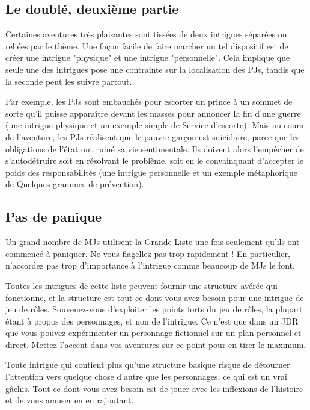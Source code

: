 \begin{multicols}{2}
\subsection*{Le doublé, deuxième partie}
\hypertarget{double2}{}

Certaines aventures très plaisantes sont tissées de deux intrigues séparées ou reliées par le thème. Une façon facile de faire marcher un tel dispositif est de créer une intrigue "physique" et une intrigue "personnelle". Cela implique que seule une des intrigues pose une contrainte sur la localisation des PJs, tandis que la seconde peut les suivre partout.

Par exemple, les PJs sont embauchés pour escorter un prince à un sommet de sorte qu'il puisse apparaître devant les masses pour annoncer la fin d'une guerre (une intrigue physique et un exemple simple de \hyperlink{escorte}{Service d'escorte}). Mais au cours de l'aventure, les PJs réalisent que le pauvre garçon est suicidaire, parce que les obligations de l'état ont ruiné sa vie sentimentale. Ils doivent alors l'empêcher de s'autodétruire soit en résolvant le problème, soit en le convainquant d'accepter le poids des responsabilités (une intrigue personnelle et un exemple métaphorique de \hyperlink{prevention}{Quelques grammes de prévention}).

\subsection*{Pas de panique}

Un grand nombre de MJs utilisent la Grande Liste une fois seulement qu'ils ont commencé à paniquer. Ne vous flagellez pas trop rapidement ! En particulier, n'accordez pas trop d'importance à l'intrigue comme beaucoup de MJs le font.

Toutes les intrigues de cette liste peuvent fournir une structure avérée qui fonctionne, et la structure est tout ce dont vous avez besoin pour une intrigue de jeu de rôles. Souvenez-vous d'exploiter les points forts du jeu de rôles, la plupart étant à propos des personnages, et non de l'intrigue. Ce n'est que dans un JDR que vous pouvez expérimenter un personnage fictionnel sur un plan personnel et direct. Mettez l'accent dans vos aventures sur ce point pour en tirer le maximum.

Toute intrigue qui contient plus qu'une structure basique risque de détourner l'attention vers quelque chose d'autre que les personnages, ce qui est un vrai gâchis. Tout ce dont vous avez besoin est de jouer avec les inflexions de l'histoire et de vous amuser en en rajoutant.


\end{multicols}
